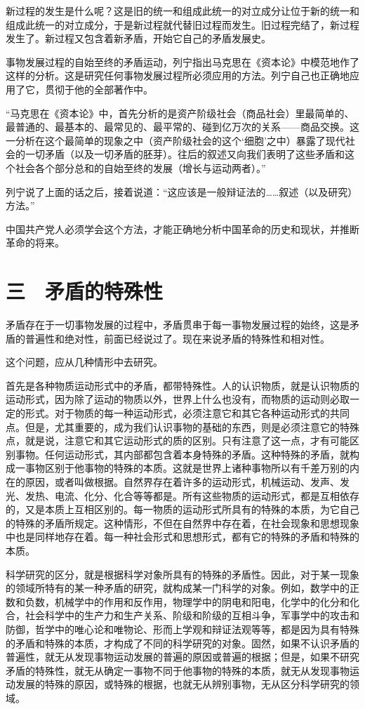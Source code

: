 新过程的发生是什么呢？这是旧的统一和组成此统一的对立成分让位于新的统一和组成此统一的对立成分，于是新过程就代替旧过程而发生。旧过程完结了，新过程发生了。新过程又包含着新矛盾，开始它自己的矛盾发展史。

事物发展过程的自始至终的矛盾运动，列宁指出马克思在《资本论》中模范地作了这样的分析。这是研究任何事物发展过程所必须应用的方法。列宁自己也正确地应用了它，贯彻于他的全部著作中。

“马克思在《资本论》中，首先分析的是资产阶级社会（商品社会）里最简单的、最普通的、最基本的、最常见的、最平常的、碰到亿万次的关系——商品交换。这一分析在这个最简单的现象之中（资产阶级社会的这个‘细胞’之中）暴露了现代社会的一切矛盾（以及一切矛盾的胚芽）。往后的叙述又向我们表明了这些矛盾和这个社会各个部分总和的自始至终的发展（增长与运动两者）。”

列宁说了上面的话之后，接着说道：“这应该是一般辩证法的……叙述（以及研究）方法。”

中国共产党人必须学会这个方法，才能正确地分析中国革命的历史和现状，并推断革命的将来。

\section{三　矛盾的特殊性}

矛盾存在于一切事物发展的过程中，矛盾贯串于每一事物发展过程的始终，这是矛盾的普遍性和绝对性，前面已经说过了。现在来说矛盾的特殊性和相对性。

这个问题，应从几种情形中去研究。

首先是各种物质运动形式中的矛盾，都带特殊性。人的认识物质，就是认识物质的运动形式，因为除了运动的物质以外，世界上什么也没有，而物质的运动则必取一定的形式。对于物质的每一种运动形式，必须注意它和其它各种运动形式的共同点。但是，尤其重要的，成为我们认识事物的基础的东西，则是必须注意它的特殊点，就是说，注意它和其它运动形式的质的区别。只有注意了这一点，才有可能区别事物。任何运动形式，其内部都包含着本身特殊的矛盾。这种特殊的矛盾，就构成一事物区别于他事物的特殊的本质。这就是世界上诸种事物所以有千差万别的内在的原因，或者叫做根据。自然界存在着许多的运动形式，机械运动、发声、发光、发热、电流、化分、化合等等都是。所有这些物质的运动形式，都是互相依存的，又是本质上互相区别的。每一物质的运动形式所具有的特殊的本质，为它自己的特殊的矛盾所规定。这种情形，不但在自然界中存在着，在社会现象和思想现象中也是同样地存在着。每一种社会形式和思想形式，都有它的特殊的矛盾和特殊的本质。

科学研究的区分，就是根据科学对象所具有的特殊的矛盾性。因此，对于某一现象的领域所特有的某一种矛盾的研究，就构成某一门科学的对象。例如，数学中的正数和负数，机械学中的作用和反作用，物理学中的阴电和阳电，化学中的化分和化合，社会科学中的生产力和生产关系、阶级和阶级的互相斗争，军事学中的攻击和防御，哲学中的唯心论和唯物论、形而上学观和辩证法观等等，都是因为具有特殊的矛盾和特殊的本质，才构成了不同的科学研究的对象。固然，如果不认识矛盾的普遍性，就无从发现事物运动发展的普遍的原因或普遍的根据；但是，如果不研究矛盾的特殊性，就无从确定一事物不同于他事物的特殊的本质，就无从发现事物运动发展的特殊的原因，或特殊的根据，也就无从辨别事物，无从区分科学研究的领域。

